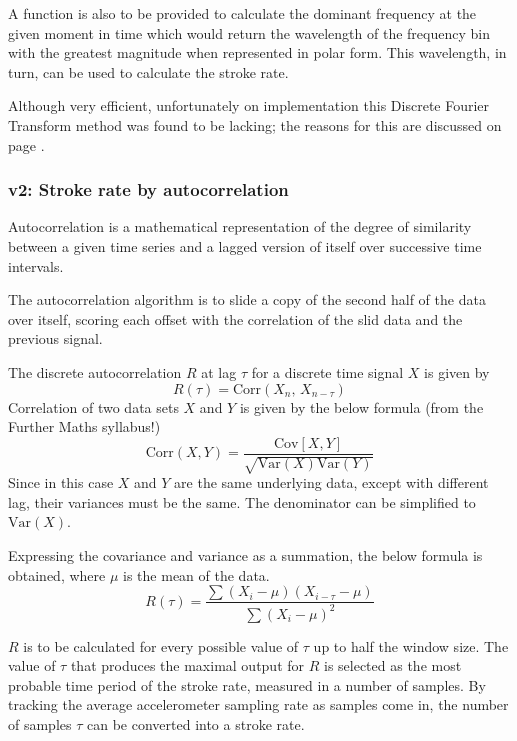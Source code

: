 \documentclass[11pt,twoside,a4paper]{report}
\begin{document}
A function is also to be provided to calculate the dominant frequency at the given moment in time which would return the wavelength of the frequency bin with the greatest magnitude when represented in polar form. This wavelength, in turn, can be used to calculate the stroke rate.

Although very efficient, unfortunately on implementation this Discrete Fourier Transform method was found to be lacking; the reasons for this are discussed on page \pageref{DFT_downsides}.

\subsubsection{v2: Stroke rate by autocorrelation}

Autocorrelation is a mathematical representation of the degree of similarity between a given time series and a lagged version of itself over successive time intervals. \cite{wiki_autocorrelation_2021}

The autocorrelation algorithm is to slide a copy of the second half of the data over itself, scoring each offset with the correlation of the slid data and the previous signal.

\label{par:autoCorAlgo}
The discrete autocorrelation $R$ at lag $\tau$ for a discrete time signal $X$ is given by
\begin{equation*}
  R(\tau) = \text{Corr}\left(X_n,\,X_{n-\tau}\right)
\end{equation*}
Correlation of two data sets $X$ and $Y$ is given by the below formula (from the Further Maths syllabus!)
\begin{equation*}
  \text{Corr}\left(X, Y\right) = \frac{\text{Cov}\left[X, Y\right]}{\sqrt{\text{Var}\left(X\right)\text{Var}\left(Y\right)}}
\end{equation*}
Since in this case $X$ and $Y$ are the same underlying data, except with different lag, their variances must be the same. The denominator can be simplified to $\text{Var}\left(X\right)$.

Expressing the covariance and variance as a summation, the below formula is obtained, where $\mu$ is the mean of the data.
\begin{equation}
  R\left(\tau\right) = \frac{\sum \left(X_i - \mu\right)\left(X_{i-\tau} - \mu\right)}{\sum \left(X_i - \mu\right)^2}
\end{equation}

$R$ is to be calculated for every possible value of $\tau$ up to half the window size. The value of $\tau$ that produces the maximal output for $R$ is selected as the most probable time period of the stroke rate, measured in a number of samples. By tracking the average accelerometer sampling rate as samples come in, the number of samples $\tau$ can be converted into a stroke rate.
\end{document}
